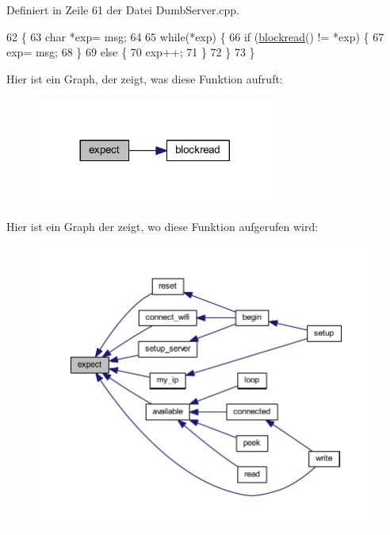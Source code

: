 Definiert in Zeile 61 der Datei Dumb\+Server.\+cpp.


\begin{DoxyCode}
62 \{
63   \textcolor{keywordtype}{char} *exp= msg;
64 
65   \textcolor{keywordflow}{while}(*exp) \{
66     \textcolor{keywordflow}{if} (\hyperlink{class_esp_server_ac2b4ae3c7ebcd751c4c8020412fa3270}{blockread}() != *exp) \{
67       exp= msg;
68     \}
69     \textcolor{keywordflow}{else} \{
70       exp++;
71     \}
72   \}
73 \}
\end{DoxyCode}
Hier ist ein Graph, der zeigt, was diese Funktion aufruft\+:\nopagebreak
\begin{figure}[H]
\begin{center}
\leavevmode
\includegraphics[width=221pt]{class_esp_server_aff5ea67ab96af075223b2b836036ccf1_cgraph}
\end{center}
\end{figure}
Hier ist ein Graph der zeigt, wo diese Funktion aufgerufen wird\+:\nopagebreak
\begin{figure}[H]
\begin{center}
\leavevmode
\includegraphics[width=350pt]{class_esp_server_aff5ea67ab96af075223b2b836036ccf1_icgraph}
\end{center}
\end{figure}
\mbox{\label{class_esp_server_adac116554b543b7c4228c018a85882f5}} 

